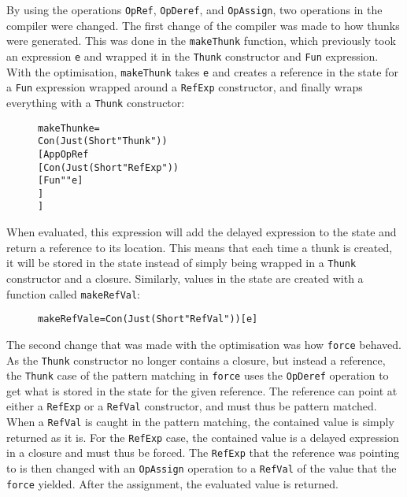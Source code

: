 By using the operations \texttt{OpRef}, \texttt{OpDeref}, and \texttt{OpAssign},
two operations in the compiler were changed. The first change of the compiler
was made to how thunks were generated. This was done in the
\texttt{makeThunk} function, which previously took an expression \texttt{e} and
wrapped it in the \texttt{Thunk} constructor and \texttt{Fun} expression. With
the optimisation, \texttt{makeThunk}
takes \texttt{e} and creates a reference in the state for a \texttt{Fun}
expression wrapped around a \texttt{RefExp} constructor, and finally wraps
everything with a \texttt{Thunk} constructor:
\begin{figure}[H]
\begin{alltt}
  makeThunk e =
    Con (Just (Short "Thunk"))
      [App OpRef
        [Con (Just (Short "RefExp"))
          [Fun "" e]
        ]
      ]
\end{alltt}
\end{figure}
When evaluated, this expression will add the delayed expression to the state and
return a reference to its location. This means that each time a thunk is
created, it will be stored in the state instead of simply being wrapped in a
\texttt{Thunk} constructor and a closure. Similarly, values in the state are
created with a function called \texttt{makeRefVal}:
\begin{figure}[H]
\begin{alltt}
  makeRefVal e = Con (Just (Short "RefVal")) [e]
\end{alltt}
\end{figure}

The second change that was made with the optimisation was how \texttt{force}
behaved. As the \texttt{Thunk} constructor no longer contains a closure, but
instead a reference, the \texttt{Thunk} case of the pattern matching in
\texttt{force} uses the \texttt{OpDeref} operation to get what is stored in
the state for the given reference. The reference can point at either a
\texttt{RefExp} or a \texttt{RefVal} constructor, and must thus be pattern
matched. When a \texttt{RefVal} is caught in the pattern matching, the contained
value is simply returned as it is. For the \texttt{RefExp} case, the contained
value is a delayed expression in a closure and must thus be forced.
The \texttt{RefExp} that the reference was pointing to is then changed with an
\texttt{OpAssign} operation to a \texttt{RefVal} of the value that the
\texttt{force} yielded. After the assignment, the evaluated value is returned.

